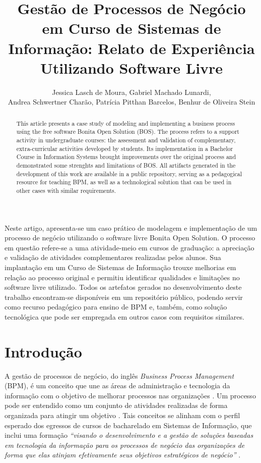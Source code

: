 \documentclass[12pt]{article}
\title{Gestão de Processos de Negócio em Curso de Sistemas de Informação: Relato de Experiência Utilizando Software Livre}
\author{Jessica Lasch de Moura\inst{1}, Gabriel Machado Lunardi\inst{1},\\
Andrea Schwertner Charão\inst{1}, Patrícia Pitthan Barcelos\inst{1}, Benhur de Oliveira Stein\inst{1}}
\begin{document}
\maketitle


\begin{resumo}
Neste artigo, apresenta-se um caso prático de modelagem e implementação de um processo de negócio utilizando o software livre Bonita Open Solution. O processo em questão refere-se a uma atividade-meio em cursos de graduação: a apreciação e validação de atividades complementares realizadas pelos alunos. Sua implantação em um Curso de Sistemas de Informação trouxe melhorias em relação ao processo original e permitiu identificar qualidades e limitações no software livre utilizado. Todos os artefatos gerados no desenvolvimento deste trabalho encontram-se disponíveis em um repositório público, podendo servir como recurso pedagógico para ensino de BPM e, também, como solução tecnológica que pode ser empregada em outros casos com requisitos similares.
\end{resumo}


\begin{abstract}
This article presents a case study of modeling and implementing a business process using the free software Bonita Open Solution (BOS). The process refers to a support activity in undergraduate courses: the assessment and validation of complementary, extra-curricular activities developed by students. Its implementation in a Bachelor Course in Information Systems brought improvements over the original process and demonstrated some strenghts and limitations of BOS. All artifacts generated in the development of this work are available in a public repository, serving as a pedagogical resource for teaching BPM, as well as a technological solution that can be used in other cases with similar requirements.
\end{abstract}


\section{Introdução}

A gestão de processos de negócio, do inglês \emph{Business Process Management} (BPM), é um conceito que une as áreas de administração e tecnologia da informação com o objetivo de melhorar processos nas organizações \cite{weske}. Um processo pode ser entendido como um conjunto de atividades realizadas de forma organizada para atingir um objetivo \cite{ABPMP}. Tais conceitos se alinham com o perfil esperado dos egressos de cursos de bacharelado em Sistemas de Informação, que inclui uma formação \emph{“visando o desenvolvimento e a gestão de soluções baseadas em tecnologia da informação para os processos de negócio das organizações de forma que elas atinjam efetivamente seus objetivos estratégicos de negócio”} \cite{parecer:136}.
\end{document}

